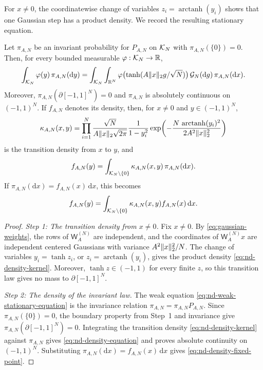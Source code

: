 \documentclass[11pt,reqno,a4paper]{article}
\DeclareMathOperator{\arctanh}{arctanh}
\begin{document}
For $x\neq0$, the coordinatewise change of variables $z_i=\arctanh(y_i)$
shows that one Gaussian step has a product density. We record the resulting
stationary equation.
\begin{proposition}
\label{prop:nd-stationary-equation}
  Let $\pi_{A,N}$ be an invariant probability for $P_{A,N}$ on $\mathcal K_N$ with
  $\pi_{A,N}(\{0\})=0$. Then, for every bounded measurable
  $\varphi:\mathcal K_N\to\mathbb{R}$,
  \begin{equation}\label{eq:nd-weak-stationary-equation}
    \int_{\mathcal K_N}\varphi(y)\,\pi_{A,N}(\mathrm{d}y)
    =
    \int_{\mathcal K_N}
    \int_{\mathbb{R}^N}
    \varphi\bigl(\tanh(A\lVert x\rVert_2 g/\sqrt N)\bigr)\,
    \mathcal G_N(\mathrm{d}g)\,\pi_{A,N}(\mathrm{d}x).
  \end{equation}
  Moreover, $\pi_{A,N}(\partial[-1,1]^N)=0$ and $\pi_{A,N}$ is absolutely
  continuous on $(-1,1)^N$. If $f_{A,N}$ denotes its density, then, for
  $x\neq0$ and $y\in(-1,1)^N$,
  \begin{equation}\label{eq:nd-density-kernel}
    \kappa_{A,N}(x,y)
    =
    \prod_{i=1}^N
    \frac{\sqrt N}{A\norm{x}_2\sqrt{2\pi}}
    \frac{1}{1-y_i^2}
    \exp\left(
      -\frac{N\,\arctanh(y_i)^2}
      {2A^2\norm{x}_2^2}
    \right)
  \end{equation}
  is the transition density from $x$ to $y$, and
  \begin{equation}\label{eq:nd-density-equation}
    f_{A,N}(y)
    =
    \int_{\mathcal K_N\setminus\{0\}}
    \kappa_{A,N}(x,y)\,\pi_{A,N}(\mathrm{d}x).
  \end{equation}
  If $\pi_{A,N}(\mathrm{d}x)=f_{A,N}(x)\,\mathrm{d}x$, this becomes
  \begin{equation}\label{eq:nd-density-fixed-point}
    f_{A,N}(y)
    =
    \int_{\mathcal K_N\setminus\{0\}}
    \kappa_{A,N}(x,y)f_{A,N}(x)\,\mathrm{d}x .
  \end{equation}
\end{proposition}

\begin{proof}
  \emph{Step 1: The transition density from $x\neq0$.}
  Fix $x\neq0$. By \cref{eq:gaussian-weights}, the rows of
  $\mathsf W_A^{(N)}$ are independent, and the coordinates of
  $\mathsf W_A^{(N)}x$ are independent centered Gaussians with variance
  $A^2\lVert x\rVert_2^2/N$. The change of variables
  $y_i=\tanh z_i$, or $z_i=\arctanh(y_i)$, gives the product density
  \cref{eq:nd-density-kernel}. Moreover, $\tanh z\in(-1,1)$ for every finite
  $z$, so this transition law gives no mass to $\partial[-1,1]^N$.

  \emph{Step 2: The density of the invariant law.}
  The weak equation \cref{eq:nd-weak-stationary-equation} is the invariance
  relation $\pi_{A,N}=\pi_{A,N}P_{A,N}$. Since $\pi_{A,N}(\{0\})=0$, the
  boundary property from Step~1 and invariance give
  $\pi_{A,N}(\partial[-1,1]^N)=0$. Integrating the transition density
  \cref{eq:nd-density-kernel} against $\pi_{A,N}$ gives
  \cref{eq:nd-density-equation} and proves absolute continuity on
  $(-1,1)^N$. Substituting
  $\pi_{A,N}(\mathrm{d}x)=f_{A,N}(x)\,\mathrm{d}x$ gives
  \cref{eq:nd-density-fixed-point}.
\end{proof}
\end{document}
